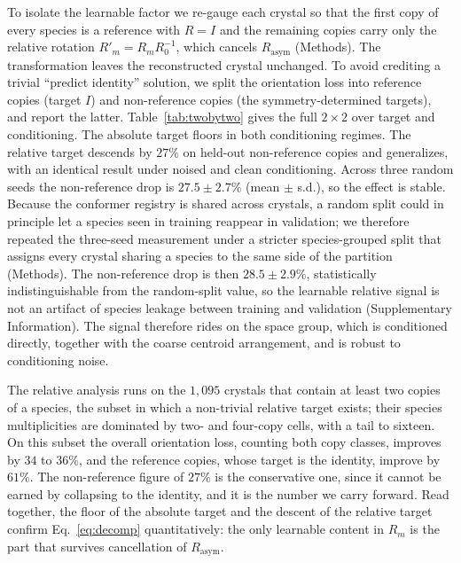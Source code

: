 \documentclass[11pt]{article}
\begin{document}
To isolate the learnable factor we re-gauge each crystal so that the first copy
of every species is a reference with $R=I$ and the remaining copies carry only
the relative rotation $R'_m = R_m R_0^{-1}$, which cancels $R_{\text{asym}}$
(Methods). The transformation leaves the reconstructed crystal unchanged. To
avoid crediting a trivial ``predict identity'' solution, we split the
orientation loss into reference copies (target $I$) and non-reference copies
(the symmetry-determined targets), and report the latter.
Table~\ref{tab:twobytwo} gives the full $2\times2$ over target and conditioning.
The absolute target floors in both conditioning regimes. The relative target
descends by $27\%$ on held-out non-reference copies and generalizes, with an
identical result under noised and clean conditioning. Across three random seeds
the non-reference drop is $27.5\pm2.7\%$ (mean $\pm$ s.d.), so the effect is
stable. Because the conformer registry is shared across crystals, a random split
could in principle let a species seen in training reappear in validation; we
therefore repeated the three-seed measurement under a stricter species-grouped
split that assigns every crystal sharing a species to the same side of the
partition (Methods). The non-reference drop is then $28.5\pm2.9\%$, statistically
indistinguishable from the random-split value, so the learnable relative signal
is not an artifact of species leakage between training and validation
(Supplementary Information). The signal therefore rides on the space group, which is conditioned
directly, together with the
coarse centroid arrangement, and is robust to conditioning noise.

The relative analysis runs on the $1{,}095$ crystals that contain at least two
copies of a species, the subset in which a non-trivial relative target exists;
their species multiplicities are dominated by two- and four-copy cells, with a
tail to sixteen. On this subset the overall orientation loss, counting both
copy classes, improves by $34$ to $36\%$, and the reference copies, whose target
is the identity, improve by $61\%$. The non-reference figure of $27\%$ is the
conservative one, since it cannot be earned by collapsing to the identity, and it
is the number we carry forward. Read together, the floor of the absolute target
and the descent of the relative target confirm Eq.~\eqref{eq:decomp}
quantitatively: the only learnable content in $R_m$ is the part that survives
cancellation of $R_{\text{asym}}$.
\end{document}
